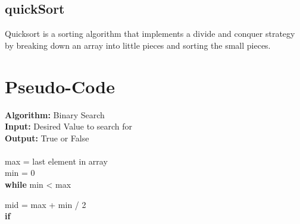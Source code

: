 \documentclass[10pt,letterpaper]{article}
\begin{document}
	\subsection*{quickSort}
		Quicksort is a sorting algorithm that implements a divide and conquer strategy by breaking down an array into little pieces and sorting the small pieces.
		
\section{Pseudo-Code}
\textbf{Algorithm:} Binary Search\\
\textbf{Input:} Desired Value to search for\\
\textbf{Output:} True or False\\
\\
max = last element in array\\
min = 0\\
\textbf{while} min < max


     mid = max + min / 2\\


	\textbf{if}
\end{document}
